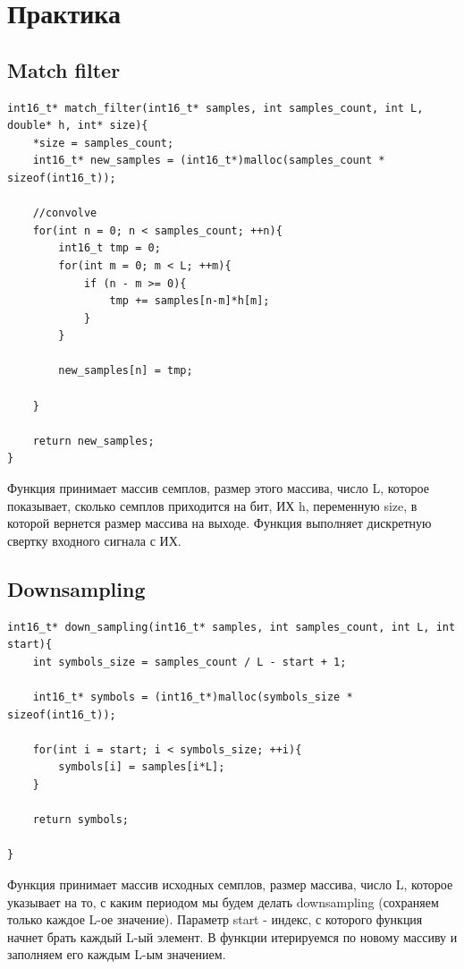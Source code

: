 \chapter{Практика}
\label{ch:chap2}

\section{Match filter}

\begin{lstlisting}
int16_t* match_filter(int16_t* samples, int samples_count, int L, double* h, int* size){
    *size = samples_count;
    int16_t* new_samples = (int16_t*)malloc(samples_count * sizeof(int16_t)); 

    //convolve
    for(int n = 0; n < samples_count; ++n){
        int16_t tmp = 0;
        for(int m = 0; m < L; ++m){
            if (n - m >= 0){
                tmp += samples[n-m]*h[m];
            }
        }

        new_samples[n] = tmp;
      
    }

    return new_samples;
}

\end{lstlisting}

Функция принимает массив семплов, размер этого массива, число L, которое показывает, сколько семплов приходится на бит, ИХ h, переменную
size, в которой вернется размер массива на выходе. Функция выполняет дискретную свертку входного сигнала с ИХ.

\section{Downsampling}

\begin{lstlisting}
int16_t* down_sampling(int16_t* samples, int samples_count, int L, int start){
    int symbols_size = samples_count / L - start + 1;

    int16_t* symbols = (int16_t*)malloc(symbols_size * sizeof(int16_t));
    
    for(int i = start; i < symbols_size; ++i){
        symbols[i] = samples[i*L];
    }

    return symbols;

}
\end{lstlisting}

Функция принимает массив исходных семплов, размер массива, число L, которое указывает на то, с каким периодом мы будем делать 
downsampling (сохраняем только каждое L-ое значение). Параметр start - индекс, с которого функция начнет брать каждый L-ый элемент.
В функции итерируемся по новому массиву и заполняем его каждым L-ым значением.

